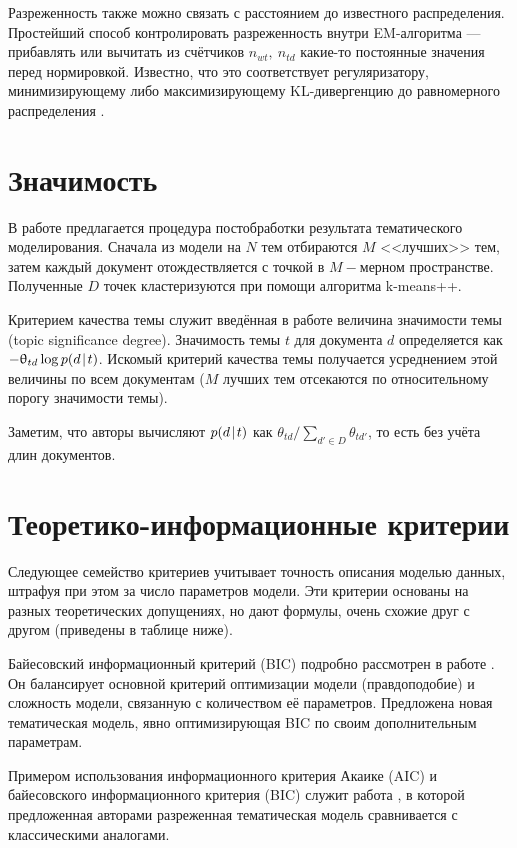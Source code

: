 Разреженность также можно связать с расстоянием до известного распределения. Простейший способ контролировать разреженность внутри EM-алгоритма  --- прибавлять или вычитать из счётчиков $n_{wt},~n_{td}$ какие-то постоянные значения перед нормировкой. Известно, что это соответствует регуляризатору, минимизирующему либо максимизирующему KL-дивергенцию до равномерного распределения \cite{voron15mlj}.

\section{Значимость}

В работе \cite{ma2014three} предлагается процедура постобработки результата тематического моделирования. Сначала из модели на $N$ тем отбираются $M$ <<лучших>> тем, затем каждый документ отождествляется с точкой в $M-$мерном пространстве. Полученные $D$ точек кластеризуются при помощи алгоритма k-means++.

Критерием качества темы служит введённая в работе величина значимости темы (topic significance degree). Значимость темы $t$ для документа $d$ определяется как $-\uptheta_{td}\log p(d\mspace{2mu}{|}\mspace{2mu} t)$. Искомый критерий качества темы получается усреднением этой величины по всем документам ($M$ лучших тем отсекаются по относительному порогу значимости темы).

Заметим, что авторы вычисляют $p(d\mspace{2mu}{|}\mspace{2mu} t)$ как 
$\theta_{td} / \sum_{d' \in D} \theta_{td'}$, 
то есть без учёта длин документов.

\section{Теоретико-информационные критерии}

Следующее семейство критериев учитывает точность описания моделью данных, штрафуя при этом за число параметров модели. Эти критерии основаны на разных теоретических допущениях, но дают формулы, очень схожие друг с другом (приведены в таблице ниже).

Байесовский информационный критерий (BIC) подробно рассмотрен в работе \cite{soleimani14parsimonious}. Он балансирует основной критерий оптимизации модели (правдоподобие) и сложность модели, связанную с количеством её параметров. Предложена новая тематическая модель, явно оптимизирующая BIC по своим дополнительным параметрам.

Примером использования информационного критерия Акаике (AIC) и байесовского информационного критерия (BIC) служит работа \cite{than2012fully}, в которой предложенная авторами разреженная тематическая модель сравнивается с классическими аналогами.

